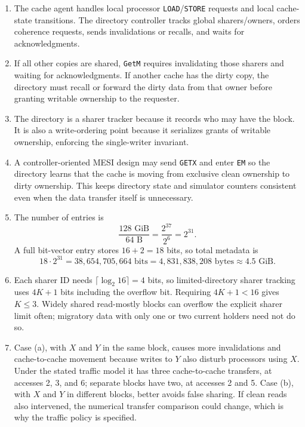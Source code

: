 \documentclass[11pt]{article}
\begin{document}
\begin{enumerate}
    \item The cache agent handles local processor \texttt{LOAD}/\texttt{STORE} requests and local cache-state transitions.
    The directory controller tracks global sharers/owners, orders coherence requests, sends invalidations or recalls, and waits for acknowledgments.

    \item If all other copies are shared, \texttt{GetM} requires invalidating those sharers and waiting for acknowledgments.
    If another cache has the dirty copy, the directory must recall or forward the dirty data from that owner before granting writable ownership to the requester.

    \item The directory is a sharer tracker because it records who may have the block.
    It is also a write-ordering point because it serializes grants of writable ownership, enforcing the single-writer invariant.

    \item A controller-oriented MESI design may send \texttt{GETX} and enter \texttt{EM} so the directory learns that the cache is moving from exclusive clean ownership to dirty ownership.
    This keeps directory state and simulator counters consistent even when the data transfer itself is unnecessary.

    \item The number of entries is
    \[
        \frac{128\text{ GiB}}{64\text{ B}}=\frac{2^{37}}{2^6}=2^{31}.
    \]
    A full bit-vector entry stores \(16+2=18\) bits, so total metadata is
    \[
        18\cdot2^{31}=38{,}654{,}705{,}664\text{ bits}
        =4{,}831{,}838{,}208\text{ bytes}\approx4.5\text{ GiB}.
    \]

    \item Each sharer ID needs \(\lceil\log_2 16\rceil=4\) bits, so limited-directory sharer tracking uses \(4K+1\) bits including the overflow bit.
    Requiring \(4K+1<16\) gives \(K\le3\).
    Widely shared read-mostly blocks can overflow the explicit sharer limit often; migratory data with only one or two current holders need not do so.

    \item Case (a), with \(X\) and \(Y\) in the same block, causes more invalidations and cache-to-cache movement because writes to \(Y\) also disturb processors using \(X\).
    Under the stated traffic model it has three cache-to-cache transfers, at accesses 2, 3, and 6; separate blocks have two, at accesses 2 and 5.
    Case (b), with \(X\) and \(Y\) in different blocks, better avoids false sharing.
    If clean reads also intervened, the numerical transfer comparison could change, which is why the traffic policy is specified.


\end{enumerate}
\end{document}
